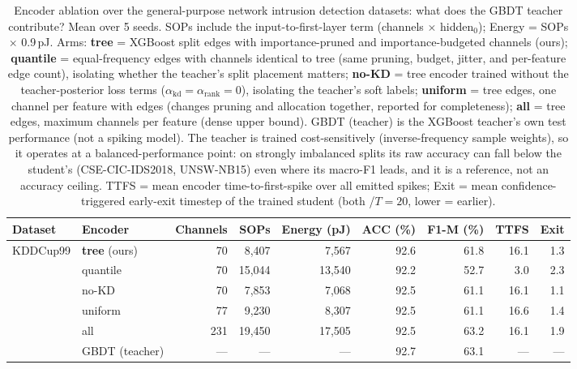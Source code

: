 \begin{table}[!ht]
\centering
\renewcommand{\arraystretch}{1.05}
\caption{Encoder ablation over the general-purpose network intrusion detection datasets: what does the GBDT teacher contribute? Mean over 5 seeds. SOPs include the input-to-first-layer term (channels $\times$ hidden$_0$); Energy = SOPs $\times$ 0.9\,pJ. Arms: \textbf{tree} = XGBoost split edges with importance-pruned and importance-budgeted channels (ours); \textbf{quantile} = equal-frequency edges with channels identical to tree (same pruning, budget, jitter, and per-feature edge count), isolating whether the teacher's split placement matters; \textbf{no-KD} = tree encoder trained without the teacher-posterior loss terms ($\alpha_{\mathrm{kd}} = \alpha_{\mathrm{rank}} = 0$), isolating the teacher's soft labels; \textbf{uniform} = tree edges, one channel per feature with edges (changes pruning and allocation together, reported for completeness); \textbf{all} = tree edges, maximum channels per feature (dense upper bound). GBDT (teacher) is the XGBoost teacher's own test performance (not a spiking model). The teacher is trained cost-sensitively (inverse-frequency sample weights), so it operates at a balanced-performance point: on strongly imbalanced splits its raw accuracy can fall below the student's (CSE-CIC-IDS2018, UNSW-NB15) even where its macro-F1 leads, and it is a reference, not an accuracy ceiling. TTFS = mean encoder time-to-first-spike over all emitted spikes; Exit = mean confidence-triggered early-exit timestep of the trained student (both /$T{=}20$, lower = earlier).}
\label{tab:encoder_ablation_general}
{\scriptsize
\begin{tabular}{l l r r r r r r r}
\toprule
\textbf{Dataset} & \textbf{Encoder} & \textbf{Channels} & \textbf{SOPs} & \textbf{Energy (pJ)} & \textbf{ACC (\%)} & \textbf{F1-M (\%)} & \textbf{TTFS} & \textbf{Exit} \\
\midrule
\multirow{6}{*}{KDDCup99}
& \textbf{tree} (ours) & 70 & 8,407 & 7,567 & 92.6 & 61.8 & 16.1 & 1.3 \\
& quantile & 70 & 15,044 & 13,540 & 92.2 & 52.7 & 3.0 & 2.3 \\
& no-KD & 70 & 7,853 & 7,068 & 92.5 & 61.1 & 16.1 & 1.1 \\
& uniform & 77 & 9,230 & 8,307 & 92.5 & 61.1 & 16.6 & 1.4 \\
& all & 231 & 19,450 & 17,505 & 92.5 & 63.2 & 16.1 & 1.9 \\
& GBDT (teacher) & --- & --- & --- & 92.7 & 63.1 & --- & --- \\

\end{tabular}}
\end{table}
